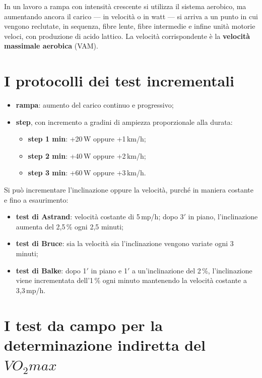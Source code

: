 In un lavoro a rampa con intensità crescente si utilizza il sistema aerobico, ma aumentando ancora
il carico --- in velocità o in watt --- si arriva a un punto in cui vengono reclutate, in sequenza,
fibre lente, fibre intermedie e infine unità motorie veloci, con produzione di acido lattico. La
velocità corrispondente è la \textbf{velocità massimale aerobica} (VAM).

\section{I protocolli dei test incrementali}

\begin{itemize}
  \item \textbf{rampa}: aumento del carico continuo e progressivo;
  \item \textbf{step}, con incremento a gradini di ampiezza proporzionale alla durata:
    \begin{itemize}
      \item \textbf{step 1 min}: +20\,W oppure +1\,km/h;
      \item \textbf{step 2 min}: +40\,W oppure +2\,km/h;
      \item \textbf{step 3 min}: +60\,W oppure +3\,km/h.
    \end{itemize}
\end{itemize}

Si può incrementare l'inclinazione oppure la velocità, purché in maniera costante e fino a
esaurimento:
\begin{itemize}
  \item \textbf{test di Astrand}: velocità costante di 5\,mp/h; dopo 3$'$ in piano, l'inclinazione
    aumenta del 2,5\,\% ogni 2,5 minuti;
  \item \textbf{test di Bruce}: sia la velocità sia l'inclinazione vengono variate ogni 3 minuti;
  \item \textbf{test di Balke}: dopo 1$'$ in piano e 1$'$ a un'inclinazione del 2\,\%,
    l'inclinazione viene incrementata dell'1\,\% ogni minuto mantenendo la velocità costante a
    3,3\,mp/h.
\end{itemize}

\section{I test da campo per la determinazione indiretta del \texorpdfstring{$VO_2max$}{VO2max}}

